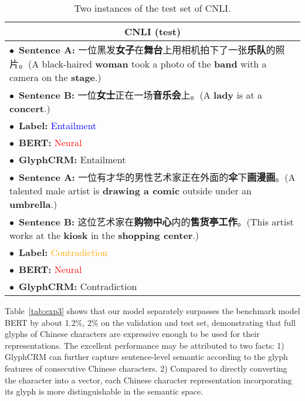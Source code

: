 \begin{CJK}{UTF8}{gbsn}
\begin{table}[H]
\renewcommand\arraystretch{1.15}
\small
\centering
\caption{Two instances of the test set of CNLI.}
\label{tab:exp6}
\begin{tabular}{|p{7.5cm}|}
\hline
\multicolumn{1}{|c|}{\textbf{CNLI (test)}} \\
\hline
$\bullet$~\textbf{Sentence A:} 一位黑发\textbf{女子}在\textbf{舞台}上用相机拍下了一张\textbf{乐队}的照片。(A black-haired \textbf{woman} took a photo of the \textbf{band} with a camera on the \textbf{stage}.)\\
$\bullet$~\textbf{Sentence B:} 一位\textbf{女士}正在一场\textbf{音乐会}上。(A \textbf{lady} is at a \textbf{concert}.)\\ 
$\bullet$~\textbf{Label:} \textcolor{blue}{Entailment}\\
$\bullet$~\textbf{BERT:} \textcolor{red}{Neural}\\
$\bullet$~\textbf{GlyphCRM:} Entailment\\
\hline
$\bullet$~\textbf{Sentence A:} 一位有才华的男性艺术家正在外面的\textbf{伞}下\textbf{画漫画}。(A talented male artist is \textbf{drawing a comic} outside under an \textbf{umbrella}.)\\
$\bullet$~\textbf{Sentence B:} 这位艺术家在\textbf{购物中心}内的\textbf{售货亭}\textbf{工作}。(This artist works at the \textbf{kiosk} in the \textbf{shopping center}.)\\ 
$\bullet$~\textbf{Label:} \textcolor{orange}{Contradiction}\\
$\bullet$~\textbf{BERT:} \textcolor{red}{Neural}\\
$\bullet$~\textbf{GlyphCRM:} Contradiction\\
\hline
\end{tabular}
\end{table}
\end{CJK}
Table~\ref{tab:exp3} shows that our model separately surpasses the benchmark model BERT by about 1.2\%, 2\% on the validation and test set, demonstrating that full glyphs of Chinese characters are expressive enough to be used for their representations.
The excellent performance may be attributed to two facts: 1) GlyphCRM can further capture sentence-level semantic according to the glyph features of consecutive Chinese characters. 2) Compared to directly converting the character into a vector, each Chinese character representation incorporating its glyph is more distinguishable in the semantic space.

